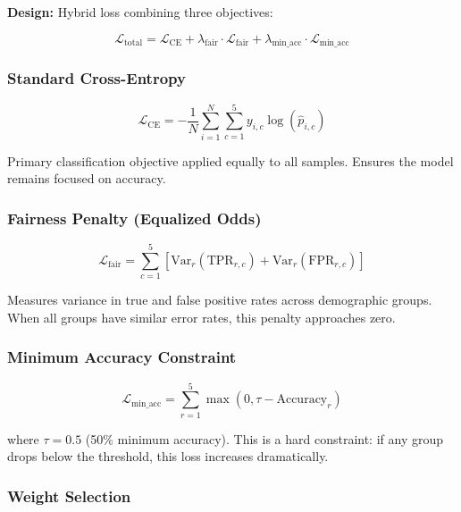 \documentclass[11pt,a4paper,oneside]{report}
\begin{document}
\textbf{Design:} Hybrid loss combining three objectives:

\begin{equation}
\mathcal{L}_{\text{total}} = \mathcal{L}_{\text{CE}} + \lambda_{\text{fair}} \cdot \mathcal{L}_{\text{fair}} + \lambda_{\text{min\_acc}} \cdot \mathcal{L}_{\text{min\_acc}}
\end{equation}

\subsubsection{Standard Cross-Entropy}

\begin{equation}
\mathcal{L}_{\text{CE}} = -\frac{1}{N} \sum_{i=1}^{N} \sum_{c=1}^{5} y_{i,c} \log(\hat{p}_{i,c})
\end{equation}

Primary classification objective applied equally to all samples. Ensures the model remains focused on accuracy.

\subsubsection{Fairness Penalty (Equalized Odds)}

\begin{equation}
\mathcal{L}_{\text{fair}} = \sum_{c=1}^{5} \left[ \text{Var}_r(\text{TPR}_{r,c}) + \text{Var}_r(\text{FPR}_{r,c}) \right]
\end{equation}

Measures variance in true and false positive rates across demographic groups. When all groups have similar error rates, this penalty approaches zero.

\subsubsection{Minimum Accuracy Constraint}

\begin{equation}
\mathcal{L}_{\text{min\_acc}} = \sum_{r=1}^{5} \max(0, \tau - \text{Accuracy}_r)
\end{equation}

where $\tau = 0.5$ (50\% minimum accuracy). This is a hard constraint: if any group drops below the threshold, this loss increases dramatically.

\subsubsection{Weight Selection}
\end{document}
